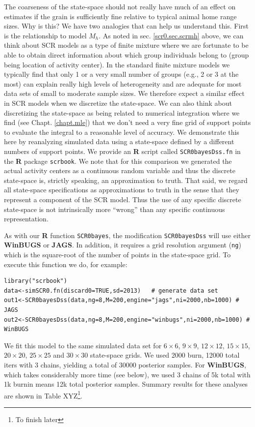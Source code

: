 {The coarseness of the state-space should not really have much of an
effect on estimates if the grain is sufficiently fine relative to
typical animal home range sizes.  Why is this?  We have two analogies
that can help us understand this. First is the relationship to model
$M_{h}$.  As noted in sec. \ref{scr0.sec.scrmh} above, we can think
about SCR models as a type of finite mixture
\citep{norris_pollock:1996, pledger:2000} where we are fortunate to be
able to obtain direct information about which group individuals
belong to (group being location of activity center).  In the standard
finite mixture models we typically find that only 1 or a very small
number of groups (e.g., 2 or 3 at the most) can explain really high
levels of heterogeneity and are adequate for most data sets of small
to moderate sample sizes. We therefore expect a similar effect in SCR
models when we discretize the state-space.
We can also
think about discretizing the state-space as being related
to numerical integration where we find (see
Chapt. \ref{chapt.mle}) that we don't need a very fine
grid of support points to evaluate the integral to a reasonable
level of accuracy. We demonstrate this here by reanalyzing simulated
data using a state-space defined by a different numbers of support points.
We provide an {\bf R} script called \mbox{\tt SCR0bayesDss.fn} in the
{\bf R} package \mbox{\tt scrbook}.  We note that for this comparison
we generated the actual activity centers as a continuous random
variable and thus the discrete state-space is, strictly speaking, an
approximation to truth. That said, we regard all state-space
specifications as approximations to truth in the sense that they
represent a component of the SCR model.
Thus the use of any
specific discrete state-space is not intrinsically more ``wrong'' than
any specific continuous representation.

As with our {\bf R} function \mbox{\tt SCR0bayes}, the modification
\mbox{\tt SCR0bayesDss} will use either {\bf WinBUGS} or {\bf
  JAGS}. In addition, it requires a grid resolution argument
(\mbox{\tt ng}) which is the square-root of the number of points in
the state-space grid.
To execute this function we do, for example:
{\small
\begin{verbatim}
library("scrbook")
data<-simSCR0.fn(discard0=TRUE,sd=2013)   # generate data set
out1<-SCR0bayesDss(data,ng=8,M=200,engine="jags",ni=2000,nb=1000) # JAGS
out2<-SCR0bayesDss(data,ng=8,M=200,engine="winbugs",ni=2000,nb=1000) # WinBUGS
\end{verbatim}
}
We fit this model to the same simulated data set for 
$6 \times 6$, $9 \times 9$, $12 \times 12$, $15\times 15$,
$20\times 20$, $25 \times 25$ and $30 \times 30$ state-space grids.
We used 2000 burn, 12000 total iters with 3 chains, yielding a total
of 30000 posterior samples.
For {\bf WinBUGS}, which takes considerably more time (see below),
 we used 3 chains of 5k total with 1k burnin means 12k
total posterior samples.
Summary results for these analyses are shown in
Table XYZ\footnote{To finish later}.

}
